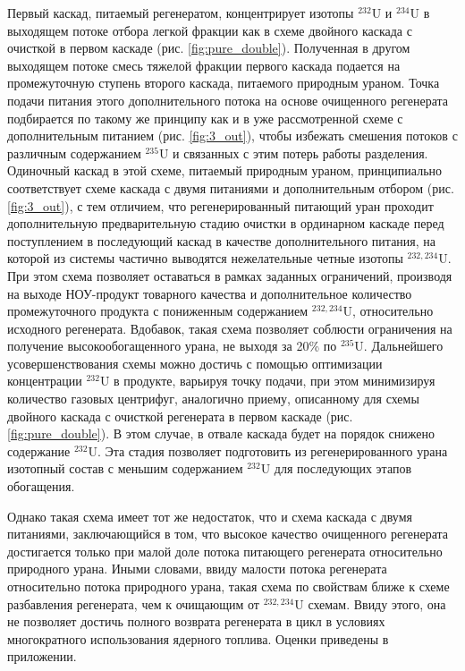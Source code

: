 Первый каскад, питаемый регенератом, концентрирует изотопы $^{232}$U и $^{234}$U в выходящем потоке отбора легкой фракции как в схеме двойного каскада с очисткой в первом каскаде (рис. \ref{fig:pure_double}). Полученная в другом выходящем потоке смесь тяжелой фракции первого каскада подается на промежуточную ступень второго каскада, питаемого природным ураном. Точка подачи питания этого дополнительного потока на основе очищенного регенерата подбирается по такому же принципу как и в уже рассмотренной схеме с дополнительным питанием (рис. \ref{fig:3_out}), чтобы избежать смешения потоков с различным содержанием $^{235}$U и связанных с этим потерь работы разделения. Одиночный каскад в этой схеме, питаемый природным ураном, принципиально соответствует схеме каскада с двумя питаниями и дополнительным отбором (рис. \ref{fig:3_out}), с тем отличием, что регенерированный питающий уран проходит дополнительную предварительную стадию очистки в ординарном каскаде перед поступлением в последующий каскад в качестве дополнительного питания, на которой из системы частично выводятся нежелательные четные изотопы $^{232,234}$U. При этом схема позволяет оставаться в рамках заданных ограничений, производя на выходе НОУ-продукт товарного качества и дополнительное количество промежуточного продукта с пониженным содержанием $^{232,234}$U, относительно исходного регенерата. Вдобавок, такая схема позволяет соблюсти ограничения на получение высокообогащенного урана, не выходя за 20\% по  $^{235}$U.
Дальнейшего усовершенствования схемы можно достичь с помощью оптимизации концентрации $^{232}$U в продукте, варьируя точку подачи, при этом минимизируя количество газовых центрифуг, аналогично приему, описанному для схемы двойного каскада с очисткой регенерата в первом каскаде (рис. \ref{fig:pure_double}). В этом случае, в отвале каскада будет на порядок снижено содержание $^{232}$U. Эта стадия позволяет подготовить из регенерированного урана изотопный состав с меньшим содержанием $^{232}$U для последующих этапов обогащения.

Однако такая схема имеет тот же недостаток, что и схема каскада с двумя питаниями, заключающийся в том, что высокое качество очищенного регенерата достигается только при малой доле потока питающего регенерата относительно природного урана. Иными словами, ввиду малости потока регенерата относительно потока природного урана, такая схема по свойствам ближе к схеме разбавления регенерата, чем к очищающим от $^{232,234}$U схемам. Ввиду этого, она не позволяет достичь полного возврата регенерата в цикл в условиях многократного использования ядерного топлива. Оценки приведены в приложении.


